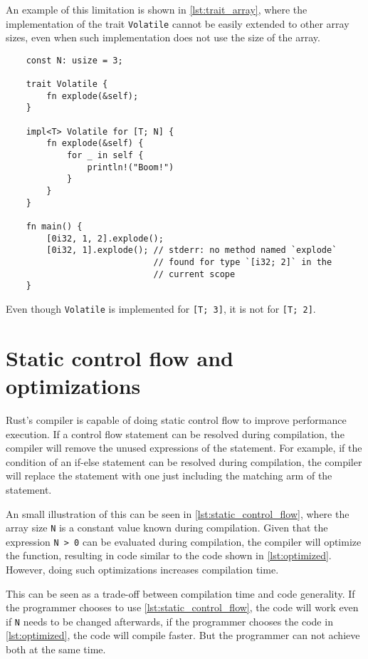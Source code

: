 An example of this limitation is shown in \ref{lst:trait_array}, where the
implementation of the trait \texttt{Volatile} cannot be easily extended to
other array sizes, even when such implementation does not use the size of the
array. 

\begin{listing}
	\begin{verbatim} 
    const N: usize = 3;

    trait Volatile {
        fn explode(&self);
    }

    impl<T> Volatile for [T; N] {
        fn explode(&self) {
            for _ in self {
                println!("Boom!")
            }
        }
    }

    fn main() {
        [0i32, 1, 2].explode(); 
        [0i32, 1].explode(); // stderr: no method named `explode` 
                             // found for type `[i32; 2]` in the
                             // current scope
    }
	\end{verbatim}
    \caption{Even though \texttt{Volatile} is implemented for \texttt{[T; 3]}, it is not for \texttt{[T; 2]}.}
  \label{lst:trait_array}
\end{listing}

\section{Static control flow and optimizations}
Rust's compiler is capable of doing static control flow to improve performance
execution. If a control flow statement can be resolved during compilation, the
compiler will remove the unused expressions of the statement. For example, if
the condition of an if-else statement can be resolved during compilation, the
compiler will replace the statement with one just including the matching arm of
the statement.

An small illustration of this can be seen in \ref{lst:static_control_flow},
where the array size \texttt{N} is a constant value known during compilation.
Given that the expression  \texttt{N > 0} can be evaluated during compilation,
the compiler will optimize the function, resulting in code similar to the code
shown in \ref{lst:optimized}. However, doing such optimizations increases
compilation time. 

This can be seen as a trade-off between compilation time and code generality.
If the programmer chooses to use \ref{lst:static_control_flow}, the code will
work even if \texttt{N} needs to be changed afterwards, if the programmer
chooses the code in \ref{lst:optimized}, the code will compile faster. But the
programmer can not achieve both at the same time.

